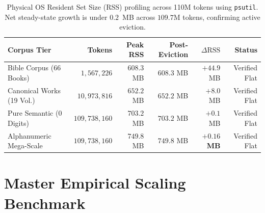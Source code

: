 \documentclass[11pt,a4paper]{article}
\begin{document}
\begin{table}[h]
\centering
\small
\renewcommand{\arraystretch}{1.15}
\begin{tabular}{lrrrrr}
\toprule
\textbf{Corpus Tier} & \textbf{Tokens} & \textbf{Peak RSS} & \textbf{Post-Eviction} & \textbf{$\Delta\text{RSS}$} & \textbf{Status} \\
\midrule
Bible Corpus (66 Books)    & $1,567,226$   & $608.3$ MB & $608.3$ MB & $+44.9$ MB & Verified Flat \\
Canonical Works (19 Vol.)  & $10,973,816$  & $652.2$ MB & $652.2$ MB & $+8.0$ MB  & Verified Flat \\
Pure Semantic (0 Digits)   & $109,738,160$ & $703.2$ MB & $703.2$ MB & $+0.1$ MB  & Verified Flat \\
Alphanumeric Mega-Scale    & $109,738,160$ & $749.8$ MB & $749.8$ MB & $\mathbf{+0.16}$ \textbf{MB} & Verified Flat \\
\bottomrule
\end{tabular}
\caption{Physical OS Resident Set Size (RSS) profiling across 110M tokens using \texttt{psutil}. Net steady-state growth is under $0.2$~MB across $109.7$M tokens, confirming active eviction.}
\label{tab:rss_metrics}
\end{table}

\section{Master Empirical Scaling Benchmark}
\label{sec:benchmarks}
\end{document}
